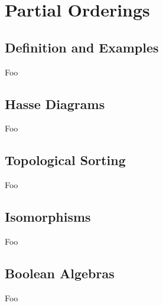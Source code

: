 \section{Partial Orderings}

\subsection{Definition and Examples}

Foo

\subsection{Hasse Diagrams}

Foo

\subsection{Topological Sorting}

Foo

\subsection{Isomorphisms}

Foo

\subsection{Boolean Algebras}

Foo


